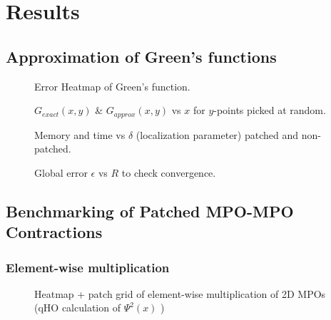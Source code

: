 \chapter{Results}
\label{chap:results}
\section{Approximation of Green's functions}

\begin{figure}[ht!]
    \caption{Error Heatmap of Green's function.}
\end{figure}

\begin{figure}[ht!]
    \caption{$G_{exact}(x,y)$ \& $G_{approx}(x,y)$ vs $x$ for $y$-points picked at random.}
\end{figure}

\begin{figure}[ht!]
    \caption{Memory and time vs $\delta$ (localization parameter) patched and non-patched.}
\end{figure}

\begin{figure}[ht!]
    \caption{Global error $\epsilon$ vs $R$ to check convergence.}
\end{figure}

\section{Benchmarking of Patched MPO-MPO Contractions}
\subsection{Element-wise multiplication}
\begin{figure}[ht!]
    \caption{Heatmap + patch grid of element-wise multiplication of 2D MPOs (qHO calculation of $\Psi^2(x)$ ) }
\end{figure}


